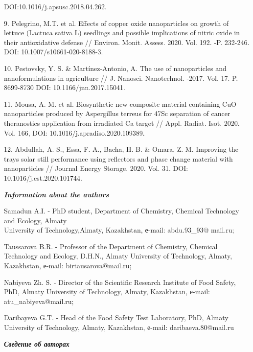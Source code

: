 \begin{noparindent}
DOI:10.1016/j.apsusc.2018.04.262.

9. Pelegrino, M.T. et al. Effects of copper oxide nanoparticles on growth
of lettuce (Lactuca sativa L) seedlings and possible implications of
nitric oxide in their antioxidative defense // Environ. Monit. Assess.
2020. Vol. 192. -P. 232-246. DOI: 10.1007/s10661-020-8188-3.

10. Pestovsky, Y. S. \& Martínez-Antonio, A. The use of nanoparticles and
nanoformulations in agriculture // J. Nanosci. Nanotechnol. -2017.
Vol. 17. P. 8699-8730 DOI: 10.1166/jnn.2017.15041.

11. Mousa, A. M. et al. Biosynthetic new composite material containing CuO
nanoparticles produced by Aspergillus terreus for 47Sc separation of
cancer theranostics application from irradiated Ca target // Appl.
Radiat. Isot. 2020. Vol. 166, DOI: 10.1016/j.apradiso.2020.109389.

12. Abdullah, A. S., Essa, F. A., Bacha, H. B. \& Omara, Z. M. Improving
the trays solar still performance using reflectors and phase change
material with nanoparticles // Journal Energy Storage. 2020. Vol. 31.
DOI: 10.1016/j.est.2020.101744.
\end{noparindent}

\emph{{\bfseries Information about the authors}}

\begin{noparindent}
Samadun A.I. - PhD student, Department of Chemistry, Chemical Technology
and Ecology, Almaty \\University of Technology,Almaty, Kazakhstan, е-mail:
abdu.93\_93@ mail.ru;

Taussarova B.R. - Professor of the Department of Chemistry, Chemical
Technology and Ecology, D.H.N., Almaty University of Technology, Almaty,
Kazakhstan, е-mail: birtausarova@mail.ru;

Nabiyeva Zh. S. - Director of the Scientific Research Institute of Food
Safety, PhD, Almaty University of Technology, Almaty, Kazakhstan,
е-mail: atu\_nabiyeva@mail.ru;

Daribayeva G.T. - Head of the Food Safety Test Laboratory, PhD, Almaty
University of Technology, Almaty, Kazakhstan, е-mail:
daribaeva.80@mail.ru
\end{noparindent}

\emph{{\bfseries Сведение об авторах}}

